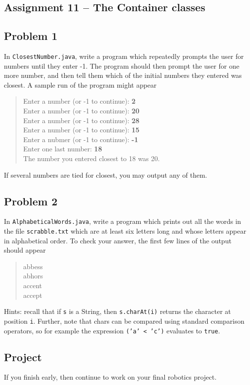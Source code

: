 \documentclass[11pt]{article}
\theoremstyle{plain}
\theoremstyle{definition}
\theoremstyle{remark}
\begin{document}
\begin{center}
\section*{Assignment 11 -- The Container classes}
\end{center}
\subsection*{Problem 1}
In {\tt ClosestNumber.java}, write a program which repeatedly prompts the user
for numbers until they enter -1. The program should then prompt the user for one
more number, and then tell them which of the initial numbers they entered was
closest. A sample run of the program might appear
\begin{quote}
  Enter a number (or -1 to continue): {\bf 2}\\
  Enter a number (or -1 to continue): {\bf 20}\\
  Enter a number (or -1 to continue): {\bf 28}\\
  Enter a number (or -1 to continue): {\bf 15}\\
  Enter a nubmer (or -1 to continue): {\bf -1}\\
  Enter one last number: {\bf 18}\\
  The number you entered closest to 18 was 20.
\end{quote}
If several numbers are tied for closest, you may output any of them.
\subsection*{Problem 2}
In {\tt AlphabeticalWords.java}, write a program which prints out all the words
in the file {\tt scrabble.txt} which are at least six letters long and whose
letters appear in alphabetical order.  To check your answer, the first few lines
of the output should appear
\begin{quote}
  abbess\\
  abhors\\
  accent\\
  accept
\end{quote}
Hints: recall that if {\tt s} is a String, then {\tt s.charAt(i)} returns the
character at position {\tt i}. Further, note that chars can be compared using
standard comparison operators, so for example the expression {\tt ('a' < 'c')}
evaluates to {\tt true}.
\subsection*{Project}
If you finish early, then continue to work on your final robotics project.
\end{document}
